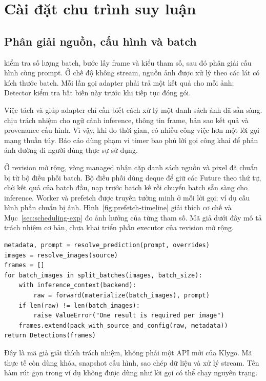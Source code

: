 \section{Cài đặt chu trình suy luận}
\subsection{Phân giải nguồn, cấu hình và batch}
 kiểm tra số lượng batch, bước lấy frame và kiểu tham số, sau đó phân giải cấu hình cùng prompt. Ở chế độ không stream, nguồn ảnh được xử lý theo các lát có kích thước batch. Mỗi lần gọi adapter phải trả một kết quả cho mỗi ảnh; Detector kiểm tra bất biến này trước khi tiếp tục đóng gói.

Việc tách  và  giúp adapter chỉ cần biết cách xử lý một danh sách ảnh đã sẵn sàng.  chịu trách nhiệm cho ngữ cảnh inference, thông tin frame, bản sao kết quả và provenance cấu hình. Vì vậy, khi đo thời gian,  có nhiều công việc hơn một lời gọi mạng thuần túy. Báo cáo dùng phạm vi timer bao phủ lời gọi công khai để phản ánh đường đi người dùng thực sự sử dụng.

Ở revision mở rộng, vòng managed nhận cặp danh sách nguồn và pixel đã chuẩn bị từ bộ điều phối batch. Bộ điều phối dùng deque để giữ các Future theo thứ tự, chờ kết quả của batch đầu, nạp trước batch kế rồi chuyển batch sẵn sàng cho inference. Worker và prefetch được truyền tường minh ở mỗi lời gọi; ví dụ  cấu hình phần chuẩn bị ảnh. Hình~\ref{fig:prefetch-timeline} giải thích cơ chế và Mục~\ref{sec:scheduling-exp} đo ảnh hưởng của từng tham số. Mã giả dưới đây mô tả trách nhiệm cơ bản, chưa khai triển phần executor của revision mở rộng.

\noindent\begin{minipage}{\linewidth}
\begin{lstlisting}[caption={Luồng điều phối rút gọn từ Detector; bỏ các nhánh xử lý lỗi để minh họa}]
metadata, prompt = resolve_prediction(prompt, overrides)
images = resolve_images(source)
frames = []
for batch_images in split_batches(images, batch_size):
    with inference_context(backend):
        raw = forward(materialize(batch_images), prompt)
    if len(raw) != len(batch_images):
        raise ValueError("One result is required per image")
    frames.extend(pack_with_source_and_config(raw, metadata))
return Detections(frames)
\end{lstlisting}
\vspace{4pt}
\end{minipage}
Đây là mã giả giải thích trách nhiệm, không phải một API mới của Klygo. Mã thực tế còn dùng khóa, snapshot cấu hình, sao chép dữ liệu và xử lý stream. Tên hàm rút gọn trong ví dụ không được dùng như lời gọi có thể chạy nguyên trạng.

